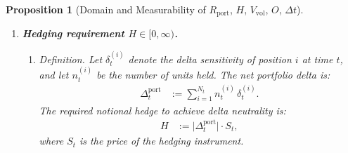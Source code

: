 \documentclass[12pt,openany]{book}
\newcommand{\calF}{\mathcal{F}}
\numberwithin{equation}{chapter}
\theoremstyle{plain}
\newtheorem{proposition}[theorem]{Proposition}
\theoremstyle{definition}
\theoremstyle{remark}
\numberwithin{equation}{chapter}
\theoremstyle{plain}
\begin{document}
\begin{proposition}[Domain and Measurability of $R_{\mathrm{port}}$,
  $H$, $V_{\mathrm{vol}}$, $O$, $\Delta t$]
\begin{enumerate}
\begin{enumerate}
      \item \emph{Measurability of $\mathrm{CVaR}_\alpha(t)$.}
        The CVaR is defined as:
        \begin{align}
          \mathrm{CVaR}_\alpha(t)
            &:= \frac{1}{\alpha}
               \int_0^{\alpha}
                 \mathrm{VaR}_u(t)\, \mathrm{d}u.
        \end{align}
        Since $\mathrm{VaR}_u(t)$ is $\calF_t$-measurable for each
        $u \in (0,\alpha)$, and the integral is a continuous linear
        functional of a measurable integrand over a deterministic
        domain, $\mathrm{CVaR}_\alpha(t)$ is $\calF_t$-measurable
        by the measurability of parameter integrals
        (Fubini--Tonelli).

      \item \emph{Domain $R_{\mathrm{port}} \in [0,1]$.}
        The normalisation function $\Phi$ maps into $[0,1]$ by
        construction, so $\rho_t \in [0,1]$.
        The clamp $\min(1, \max(0, \cdot))$ is the identity on
        $[0,1]$, hence $R_{\mathrm{port}} \in [0,1]$.

      \item \emph{Measurability of $R_{\mathrm{port}}$.}
        $\Phi$ is a fixed Borel-measurable function.
        Arithmetic averages and the clamp
        $\min(1,\max(0,\cdot))$ are continuous, hence
        Borel-measurable, operations.
        The composition of $\calF_t$-measurable inputs with
        Borel-measurable operations is $\calF_t$-measurable.
        Therefore $R_{\mathrm{port}}$ is $\calF_t$-measurable.
    \end{enumerate}

  \item \textbf{Hedging requirement $H \in [0,\infty)$.}

    \begin{enumerate}
      \item \emph{Definition.}
        Let $\delta_t^{(i)}$ denote the delta sensitivity of
        position $i$ at time $t$, and let $n_t^{(i)}$ be the
        number of units held.
        The net portfolio delta is:
        \begin{align}
          \Delta_t^{\mathrm{port}}
            &:= \sum_{i=1}^{N_t} n_t^{(i)}\, \delta_t^{(i)}.
        \end{align}
        The required notional hedge to achieve delta neutrality is:
        \begin{align}
          H
            &:= \bigl|\Delta_t^{\mathrm{port}}\bigr|
             \cdot S_t,
        \end{align}
        where $S_t$ is the price of the hedging instrument.


\end{enumerate}
\end{enumerate}
\end{proposition}
\end{document}
